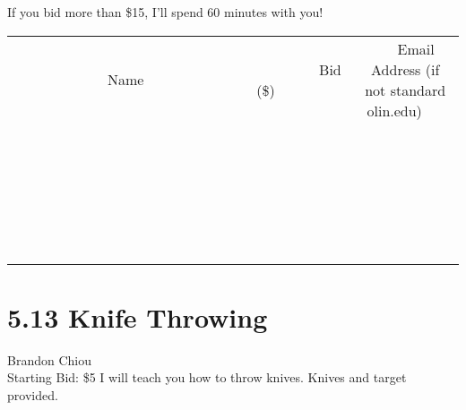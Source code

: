 \documentclass[11pt]{article}
\begin{document}
If you bid more than \$15, I'll spend 60 minutes with you!
\\[6ex]
\begin{tabular}{c c c}
~~~~~~~~~~~~~Name~~~~~~~~~~~~~ & ~~~~~~~~~Bid (\$)~~~~~~~~~  & ~~~Email Address (if not standard olin.edu)~~~\\
 & & \\
\hline
 & & \\
\hline
 & & \\
\hline
 & & \\
\hline
 & & \\
\hline
 & & \\
\hline
 & & \\
\hline
 & & \\
\hline
 & & \\
\hline
 & & \\
\hline
 & & \\
\hline
 & & \\
\hline
 & & \\
\hline
 & & \\
\hline
 & & \\
\hline
 & & \\
\hline
 & & \\
\hline
 & & \\
\hline
 & & \\
\hline
 & & \\
\hline
 & & \\
\hline
 & & \\
\hline
 & & \\
\hline
 & & \\
\hline
 & & \\
\hline
 & & \\
\hline
\end{tabular}
\newpage
\section*{5.13 Knife Throwing}
Brandon Chiou
\\
Starting Bid: \$5
\newline
I will teach you how to throw knives. Knives and target provided. 
\end{document}

